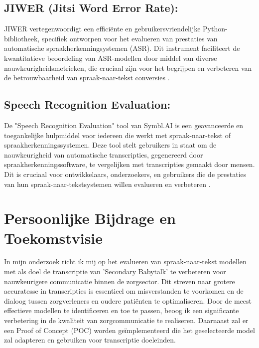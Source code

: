 \subsection{JIWER (Jitsi Word Error Rate):} JIWER vertegenwoordigt een efficiënte en gebruikersvriendelijke Python-bibliotheek, specifiek ontworpen voor het evalueren van prestaties van automatische spraakherkenningsystemen (ASR). Dit instrument faciliteert de kwantitatieve beoordeling van ASR-modellen door middel van diverse nauwkeurigheidsmetrieken, die cruciaal zijn voor het begrijpen en verbeteren van de betrouwbaarheid van spraak-naar-tekst conversies \autocite{jiwer2023}.

\subsection{Speech Recognition Evaluation:} De "Speech Recognition Evaluation" tool van Symbl.AI is een geavanceerde en toegankelijke hulpmiddel voor iedereen die werkt met spraak-naar-tekst of spraakherkenningssystemen. Deze tool stelt gebruikers in staat om de nauwkeurigheid van automatische transcripties, gegenereerd door spraakherkenningssoftware, te vergelijken met transcripties gemaakt door mensen. Dit is cruciaal voor ontwikkelaars, onderzoekers, en gebruikers die de prestaties van hun spraak-naar-tekstsystemen willen evalueren en verbeteren \autocite{speechrecognitionevaluation2021}.

\section{Persoonlijke Bijdrage en Toekomstvisie}

In mijn onderzoek richt ik mij op het evalueren van spraak-naar-tekst modellen met als doel de transcriptie van 'Secondary Babytalk' te verbeteren voor nauwkeurigere communicatie binnen de zorgsector. Dit streven naar grotere accuratesse in transcripties is essentieel om misverstanden te voorkomen en de dialoog tussen zorgverleners en oudere patiënten te optimaliseren. Door de meest effectieve modellen te identificeren en toe te passen, beoog ik een significante verbetering in de kwaliteit van zorgcommunicatie te realiseren. Daarnaast zal er een Proof of Concept (POC) worden geïmplementeerd die het geselecteerde model zal adapteren en gebruiken voor transcriptie doeleinden.



